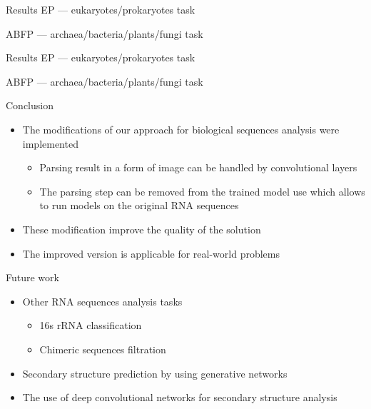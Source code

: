 \documentclass[xcolor=table]{beamer}
\begin{document}
\begin{frame}{Results}
EP --- eukaryotes/prokaryotes task

ABFP --- archaea/bacteria/plants/fungi task


\end{frame}

\begin{frame}{Results}
EP --- eukaryotes/prokaryotes task

ABFP --- archaea/bacteria/plants/fungi task


\end{frame}

\begin{frame}{Conclusion}
\begin{itemize}
    \item The modifications of our approach for biological sequences analysis were implemented
    \begin{itemize}
        \item Parsing result in a form of image can be handled by convolutional layers
        \item The parsing step can be removed from the trained model use which allows to run models on the original RNA sequences        
    \end{itemize}
    \item These modification improve the quality of the solution
    \item The improved version is applicable for real-world problems
\end{itemize}
\end{frame}

\begin{frame}{Future work}
\begin{itemize}
    \item Other RNA sequences analysis tasks
    \begin{itemize}
        \item 16s rRNA classification
        \item Chimeric sequences filtration
    \end{itemize}
    \item Secondary structure prediction by using generative networks
    \item The use of deep convolutional networks for secondary structure analysis
\end{itemize}

\end{frame}
\end{document}
